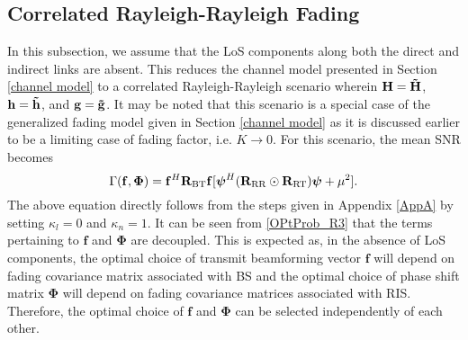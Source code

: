 \documentclass[journal,draftclsnofoot,onecolumn,12pt]{IEEEtran}
\begin{document}
\subsection{Correlated Rayleigh-Rayleigh Fading}\label{R3}
\vspace{-0.1cm}
In this subsection, we assume that the LoS components along both the direct and indirect links are absent. This reduces the channel model presented in Section \ref{channel model} to a correlated Rayleigh-Rayleigh scenario wherein $\mathbf{H} = \mathbf{\Tilde{H}}$, $\mathbf{h} = \mathbf{\Tilde{h}}$, and $\mathbf{g} = \mathbf{\Tilde{g}}$. It may be noted that this scenario is a special case of the generalized fading model given in Section \ref{channel model}  as it is discussed  earlier to be a limiting case of fading factor, i.e. $K\to 0$. For this scenario, the mean {\rm SNR} becomes
\begin{equation}
    \Gamma(\mathbf{f}, \mathbf{\Phi}) = \mathbf{f}^H\mathbf{R}_{\rm BT}\mathbf{f}[\boldsymbol{\psi}^H(\mathbf{R}_{\rm RR}\odot\mathbf{R}_{\rm RT})\boldsymbol{\psi}+\mu^2].\label{OPtProb_R3}
\end{equation}
The above equation directly follows from the steps given in Appendix \ref{AppA} by setting $\kappa_l = 0$ and $\kappa_n = 1$.
It can be  seen from \eqref{OPtProb_R3} that the terms pertaining to $\mathbf{f}$ and $\mathbf{\Phi}$ are decoupled. 
This is expected as, in the absence of LoS components, the optimal choice of transmit beamforming vector $\mathbf{f}$ will depend on fading covariance matrix associated with BS and the optimal choice of phase shift matrix $\mathbf{\Phi}$ will depend on  fading  covariance matrices associated with RIS. 
Therefore, the optimal choice of $\mathbf{f}$ and $\mathbf{\Phi}$ can be selected independently of each other. 
\end{document}
